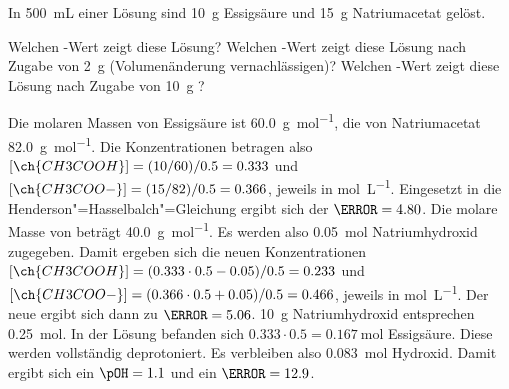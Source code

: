 \documentclass[DIV11]{scrartcl}
\begin{document}
\begin{question}
In \SI{500}{\milli\liter} einer Lösung sind \SI{10}{\gram} Essigsäure und
\SI{15}{\gram} Natriumacetat gelöst.
\begin{tasks}
  \task Welchen \pH-Wert zeigt diese Lösung?
  \task Welchen \pH-Wert zeigt diese Lösung nach Zugabe von \SI{2}{\gram}
     (Volumenänderung vernachlässigen)?
  \task Welchen \pH-Wert zeigt diese Lösung nach Zugabe von \SI{10}{\gram}
    ?
\end{tasks}
\end{question}
\begin{solution}
  \begin{tasks}
    \task Die molaren Massen von Essigsäure ist \SI{60.0}{\gram\per\mole}, die
      von Natriumacetat \SI{82.0}{\gram\per\mole}.  Die Konzentrationen betragen
      also $[\ch{CH3COOH}] = (10/60)/0.5 = 0.333$ und $[\ch{CH3COO-}] =
      (15/82)/0.5 = 0.366$, jeweils in \si{\mole\per\liter}.  Eingesetzt in die
      Henderson"=Hasselbalch"=Gleichung ergibt sich der $\pH = 4.80$.
    \task Die molare Masse von  beträgt \SI{40.0}{\gram\per\mole}.
      Es werden also \SI{0.05}{\mole} Natriumhydroxid zugegeben.  Damit
      ergeben sich die neuen Konzentrationen $[\ch{CH3COOH}] =
      (0.333\cdot0.5-0.05)/0.5 = 0.233$ und $[\ch{CH3COO-}] =
      (0.366\cdot0.5+0.05)/0.5 = 0.466$, jeweils in \si{\mole\per\liter}.  Der
      neue \pH{} ergibt sich dann zu $\pH = 5.06$.
    \task \SI{10}{\gram} Natriumhydroxid entsprechen \SI{0.25}{\mole}.  In der
      Lösung befanden sich $0.333\cdot0.5 = \SI{0.167}{\mole}$ Essigsäure.
      Diese werden vollständig deprotoniert.  Es verbleiben also
      \SI{0.083}{\mole} Hydroxid.  Damit ergibt sich ein $\pOH = 1.1$ und ein
      $\pH = 12.9$.
  \end{tasks}
\end{solution}
\end{document}
